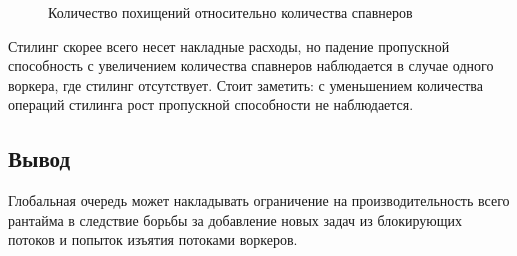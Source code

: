 \begin{figure}[H]
    \begin{center}
    \end{center}

    \caption{Количество похищений относительно количества спавнеров}
    \label{fig:tatlin:metrics:steal_ops}
\end{figure}

Стилинг скорее всего несет накладные расходы, но падение пропускной способность с увеличением количества спавнеров наблюдается в случае одного воркера, где стилинг отсутствует. Стоит заметить: с уменьшением количества операций стилинга рост пропускной способности не наблюдается.

\subsection{Вывод}

Глобальная очередь может накладывать ограничение на производительность всего рантайма в следствие борьбы за добавление новых задач из блокирующих потоков и попыток изъятия потоками воркеров.
